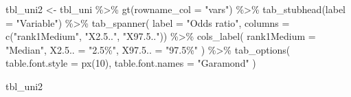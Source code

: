\documentclass[
  letterpaper,
  DIV=11,
  numbers=noendperiod]{scrartcl}
\newenvironment{Shaded}{\begin{snugshade}}{\end{snugshade}}
\newcommand{\AttributeTok}[1]{\textcolor[rgb]{0.40,0.45,0.13}{#1}}
\newcommand{\DecValTok}[1]{\textcolor[rgb]{0.68,0.00,0.00}{#1}}
\newcommand{\FunctionTok}[1]{\textcolor[rgb]{0.28,0.35,0.67}{#1}}
\newcommand{\NormalTok}[1]{\textcolor[rgb]{0.00,0.23,0.31}{#1}}
\newcommand{\OtherTok}[1]{\textcolor[rgb]{0.00,0.23,0.31}{#1}}
\newcommand{\SpecialCharTok}[1]{\textcolor[rgb]{0.37,0.37,0.37}{#1}}
\newcommand{\StringTok}[1]{\textcolor[rgb]{0.13,0.47,0.30}{#1}}
\begin{document}
\begin{Shaded}
\begin{Highlighting}[]
\NormalTok{tbl\_uni2 }\OtherTok{\textless{}{-}}\NormalTok{ tbl\_uni }\SpecialCharTok{\%\textgreater{}\%} 
  \FunctionTok{gt}\NormalTok{(}\AttributeTok{rowname\_col =} \StringTok{"vars"}\NormalTok{)  }\SpecialCharTok{\%\textgreater{}\%} 
   \FunctionTok{tab\_stubhead}\NormalTok{(}\AttributeTok{label =} \StringTok{"Variable"}\NormalTok{) }\SpecialCharTok{\%\textgreater{}\%} 
  \FunctionTok{tab\_spanner}\NormalTok{(}
    \AttributeTok{label =} \StringTok{"Odds ratio"}\NormalTok{,}
    \AttributeTok{columns =} \FunctionTok{c}\NormalTok{(}\StringTok{"rank1Medium"}\NormalTok{, }\StringTok{"X2.5.."}\NormalTok{, }\StringTok{"X97.5.."}\NormalTok{)) }\SpecialCharTok{\%\textgreater{}\%} 
  \FunctionTok{cols\_label}\NormalTok{(}
    \AttributeTok{rank1Medium =} \StringTok{"Median"}\NormalTok{,}
    \AttributeTok{X2.5.. =} \StringTok{"2.5\%"}\NormalTok{,}
    \AttributeTok{X97.5.. =} \StringTok{"97.5\%"}
\NormalTok{  ) }\SpecialCharTok{\%\textgreater{}\%} 
  \FunctionTok{tab\_options}\NormalTok{(}
    \AttributeTok{table.font.style =} \FunctionTok{px}\NormalTok{(}\DecValTok{10}\NormalTok{),}
    \AttributeTok{table.font.names =} \StringTok{"Garamond"}
\NormalTok{  )}

\NormalTok{tbl\_uni2}
\end{Highlighting}
\end{Shaded}

\begin{table}

\caption{\label{tbl-uni}Univariate analysis for round 2 rank}


\end{table}%
\end{document}
